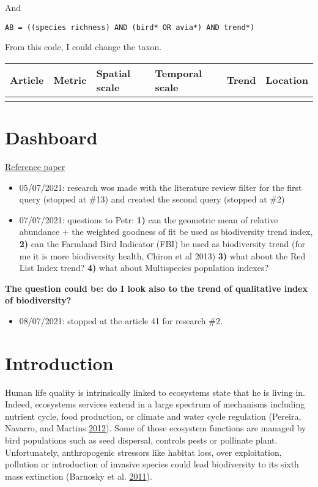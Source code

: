 \documentclass[
  12pt,
  oneside]{report}
\providecommand{\tightlist}{%
  \setlength{\itemsep}{0pt}\setlength{\parskip}{0pt}}
\begin{document}
And

\begin{verbatim}
AB = ((species richness) AND (bird* OR avia*) AND trend*) 
\end{verbatim}

From this code, I could change the taxon.

\begin{longtable}[]{@{}llllll@{}}
\toprule
Article & Metric & Spatial scale & Temporal scale & Trend & Location\tabularnewline
\midrule
\endhead
& & & & &\tabularnewline
\bottomrule
\end{longtable}

\hypertarget{dashboard}{%
\chapter*{Dashboard}\label{dashboard}}

\href{https://www.sciencedirect.com/science/article/pii/S1470160X20306658?via\%3Dihub}{Reference paper}

\begin{itemize}
\item
  05/07/2021: research wos made with the literature review filter for the first query (stopped at \#13) and created the second query (stopped at \#2)
\item
  07/07/2021: questions to Petr: \textbf{1)} can the geometric mean of relative abundance + the weighted goodness of fit be used as biodiversity trend index, \textbf{2)} can the Farmland Bird Indicator (FBI) be used as biodiversity trend (for me it is more biodiversity health, Chiron et al 2013) \textbf{3)} what about the Red List Index trend? \textbf{4)} what about Multispecies population indexes?
\end{itemize}

\textbf{The question could be: do I look also to the trend of qualitative index of biodiversity?}

\begin{itemize}
\tightlist
\item
  08/07/2021: stopped at the article 41 for research \#2.
\end{itemize}

\hypertarget{introduction}{%
\chapter{Introduction}\label{introduction}}

Human life quality is intrinsically linked to ecosystems state that he is living in. Indeed, ecosystems services extend in a large spectrum of mechanisms including nutrient cycle, food production, or climate and water cycle regulation (Pereira, Navarro, and Martins \protect\hyperlink{ref-pereira_global_2012}{2012}). Some of those ecosystem functions are managed by bird populations such as seed dispersal, controls pests or pollinate plant. Unfortunately, anthropogenic stressors like habitat loss, over exploitation, pollution or introduction of invasive species could lead biodiversity to its sixth mass extinction (Barnosky et al. \protect\hyperlink{ref-barnosky_has_2011}{2011}).
\end{document}
